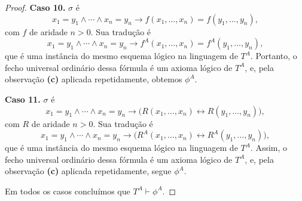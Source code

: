 \begin{proof}
    \smallskip
    \textbf{Caso 10.} $\sigma$ é
    \[
        x_1=y_1\wedge \cdots \wedge x_n=y_n \rightarrow f(x_1,\dots,x_n)=f(y_1,\dots,y_n),
    \]
    com $f$ de aridade $n>0$.
    Sua tradução é
    \[
        x_1=y_1\wedge \cdots \wedge x_n=y_n \rightarrow f^A(x_1,\dots,x_n)=f^A(y_1,\dots,y_n),
    \]
    que é uma instância do mesmo esquema lógico na linguagem de $T^A$.
    Portanto, o fecho universal ordinário dessa fórmula é um axioma lógico de $T^A$, e, pela observação \textbf{(c)} aplicada repetidamente, obtemos $\phi^A$.

    \smallskip
    \textbf{Caso 11.} $\sigma$ é
    \[
        x_1=y_1\wedge \cdots \wedge x_n=y_n \rightarrow \bigl(R(x_1,\dots,x_n)\leftrightarrow R(y_1,\dots,y_n)\bigr),
    \]
    com $R$ de aridade $n>0$.
    Sua tradução é
    \[
        x_1=y_1\wedge \cdots \wedge x_n=y_n \rightarrow \bigl(R^A(x_1,\dots,x_n)\leftrightarrow R^A(y_1,\dots,y_n)\bigr),
    \]
    que é uma instância do mesmo esquema lógico na linguagem de $T^A$.
    Assim, o fecho universal ordinário dessa fórmula é um axioma lógico de $T^A$, e, pela observação \textbf{(c)} aplicada repetidamente, segue $\phi^A$.

    \smallskip
    Em todos os casos concluímos que $T^A\vdash \phi^A$.
\end{proof}
